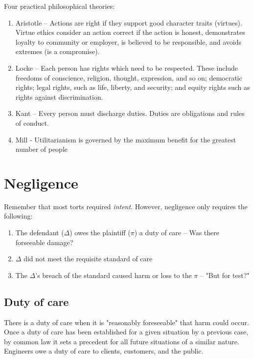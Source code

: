 \documentclass{article}
\begin{document}
Four practical philosophical theories:

\begin{enumerate}
\item Aristotle -- Actions are right if they support good character traits (virtues). Virtue ethics consider an action correct if the action is honest, demonstrates loyalty to community or employer, is believed to be responsible, and avoids extremes (is a compromise).

\item Locke -- Each person has rights which need to be respected. These include freedoms of conscience, religion, thought, expression, and so on; democratic rights; legal rights, such as life, liberty, and security; and equity rights such as rights against discrimination.

\item Kant -- Every person must discharge duties. Duties are obligations and rules of conduct.

\item Mill - Utilitarianism is governed by the maximum benefit for the greatest number of people 

\end{enumerate}

\section{Negligence}

Remember that most torts required \textit{intent}. However, negligence only requires the following:

\begin{enumerate}
\item The defendant ($\Delta$) owes the plaintiff ($\pi$) a duty of care -- Was there forseeable damage?
\item $\Delta$ did not meet the requisite standard of care 
\item The $\Delta$'s breach of the standard caused harm or loss to the $\pi$ -- "But for test?"
\end{enumerate}



\subsection{Duty of care}

There is a duty of care when it is "reasonably foreseeable" that harm could occur. Once a duty of care has been established for a given situation by a previous case, by common law it sets a precedent for all future situations of a similar nature. Engineers owe a duty of care to clients, customers, and the public.
\end{document}
